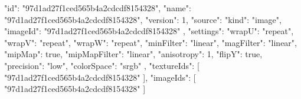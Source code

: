 {
  "id": "97d1ad27f1ced565b4a2cdcdf8154328",
  "name": "97d1ad27f1ced565b4a2cdcdf8154328",
  "version": 1,
  "source": {
    "kind": "image",
    "imageId": "97d1ad27f1ced565b4a2cdcdf8154328"
  },
  "settings": {
    "wrapU": "repeat",
    "wrapV": "repeat",
    "wrapW": "repeat",
    "minFilter": "linear",
    "magFilter": "linear",
    "mipMap": true,
    "mipMapFilter": "linear",
    "anisotropy": 1,
    "flipY": true,
    "precision": "low",
    "colorSpace": "srgb"
  },
  "textureIds": [
    "97d1ad27f1ced565b4a2cdcdf8154328"
  ],
  "imageIds": [
    "97d1ad27f1ced565b4a2cdcdf8154328"
  ]
}
